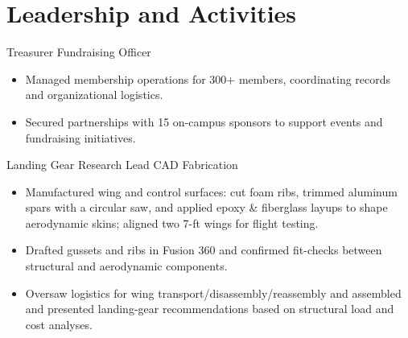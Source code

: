 \section{Leadership and Activities}

Treasurer \textbar{} Fundraising Officer
\begin{itemize}
  \item Managed membership operations for 300+ members, coordinating records and organizational logistics.
  \item Secured partnerships with 15 on-campus sponsors to support events and fundraising initiatives.
\end{itemize}
\entrygap

Landing Gear Research Lead \textbar{} CAD \textbar{} Fabrication
\begin{itemize}
  \item Manufactured wing and control surfaces: cut foam ribs, trimmed aluminum spars with a circular saw, and applied epoxy \& fiberglass layups to shape aerodynamic skins; aligned two 7-ft wings for flight testing.
  \item Drafted gussets and ribs in Fusion 360 and confirmed fit-checks between structural and aerodynamic components.
  \item Oversaw logistics for wing transport/disassembly/reassembly and assembled and presented landing-gear recommendations based on structural load and cost analyses.
\end{itemize}



